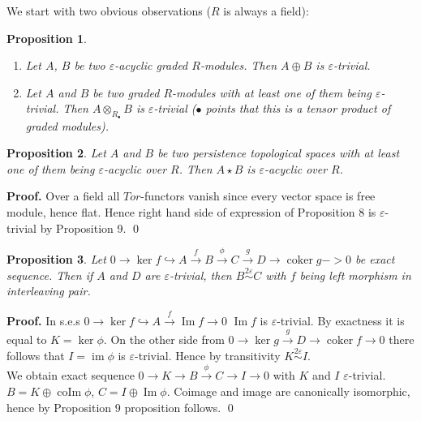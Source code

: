 \documentclass[a4paper, 12pt]{article}
\newtheorem{proposition}{Proposition}
\theoremstyle{definition}
\theoremstyle{remark}
\newenvironment{pf}{\noindent\textbf{Proof.}}{\qed}
\begin{document}
We start with two obvious observations ($R$ is always a field):

\begin{proposition}
  \begin{enumerate}
    \item Let $A$, $B$ be two $\varepsilon$-acyclic graded $R$-modules. Then $A \oplus B$ is $\varepsilon$-trivial.
    \item Let $A$ and $B$ be two graded $R$-modules with at least one of them being $\varepsilon$-trivial. Then $A \otimes_{R_{\bullet}} B$ is $\varepsilon$-trivial ($\bullet$ points that this is a tensor product of graded modules).
  \end{enumerate}
\end{proposition}

\begin{proposition}
  Let $A$ and $B$ be two persistence topological spaces with at least one of them being $\varepsilon$-acyclic over $R$. Then $A \star B$ is $\varepsilon$-acyclic over $R$.
\end{proposition}

\begin{pf}
  Over a field all $Tor$-functors vanish since every vector space is free module, hence flat. Hence right hand side of expression of Proposition 8 is $\varepsilon$-trivial by Proposition 9.
\end{pf}

\begin{proposition}
  Let $0 \to \ker{f} \hookrightarrow A \xrightarrow{f} B \xrightarrow{\phi} C \xrightarrow{g} D \to \operatorname{coker}g -> 0$ be exact sequence. Then if $A$ and $D$ are $\varepsilon$-trivial, then $B \stackrel{2\varepsilon}{\sim} C$ with $f$ being left morphism in interleaving pair.
\end{proposition}

\begin{pf}
  In s.e.s $0 \to \ker{f} \hookrightarrow A \xrightarrow{f} \operatorname{Im}f \to 0$ $\operatorname{Im}f$ is $\varepsilon$-trivial. By exactness it is equal to $K = \ker \phi$. On the other side from $0 \to \ker{g} \xrightarrow{g} D \rightarrow \operatorname{coker}f \to 0$ there follows that $I = \operatorname{im} \phi$ is $\varepsilon$-trivial. Hence by transitivity $K \stackrel{2\varepsilon}{\sim} I$.\\

  We obtain exact sequence $0 \to K \to B \xrightarrow{\phi} C \to I \to 0$ with $K$ and $I$ $\varepsilon$-trivial. $B = K \oplus \operatorname{coIm}\phi$, $C = I \oplus \operatorname{Im} \phi$. Coimage and image are canonically isomorphic, hence by Proposition 9 proposition follows.
\end{pf}
\end{document}
